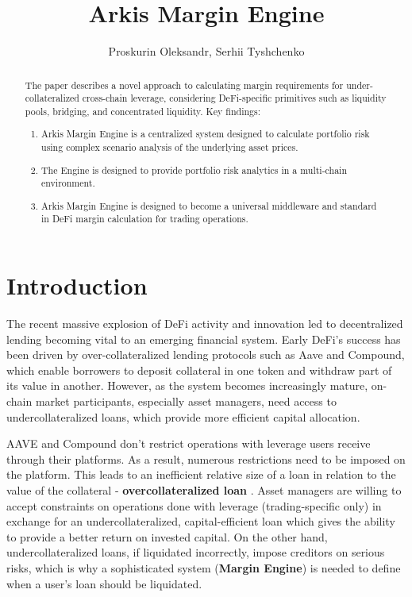 \documentclass[conference]{IEEEtran}
\begin{document}
 
\title{Arkis Margin Engine}
\author{Proskurin Oleksandr, Serhii Tyshchenko}

\maketitle
    \begin{abstract}
The paper describes a novel approach to calculating margin requirements for under-collateralized cross-chain leverage, considering DeFi-specific primitives such as liquidity pools, bridging, and concentrated liquidity. 
Key findings: 
\begin{enumerate}
  \item Arkis Margin Engine is a centralized system designed to calculate portfolio risk using complex scenario analysis of the underlying asset prices.
  \item The Engine is designed to provide portfolio risk analytics in a multi-chain environment. 
  \item Arkis Margin Engine is designed to become a universal middleware and standard in DeFi margin calculation for trading operations.
  \end{enumerate}
\end{abstract}





\section{Introduction}
The recent massive explosion of DeFi activity and innovation led to decentralized lending becoming vital to an emerging financial system. Early DeFi's success has been driven by over-collateralized lending protocols such as Aave and Compound, which enable borrowers to deposit collateral in one token and withdraw part of its value in another. However, as the system becomes increasingly mature, on-chain market participants, especially asset managers, need access to undercollateralized loans, which provide more efficient capital allocation.

AAVE and Compound don't restrict operations with leverage users receive through their platforms. As a result, numerous restrictions need to be imposed on the platform. This leads to an inefficient relative size of a loan in relation to the value of the collateral - \textbf {overcollateralized loan} \cite{aave-whitepaper} \cite{compound-whitepaper}. Asset managers are willing to accept constraints on operations done with leverage (trading-specific only) in exchange for an undercollateralized, capital-efficient loan which gives the ability to provide a better return on invested capital. On the other hand, undercollateralized loans, if liquidated incorrectly, impose creditors on serious risks, which is why a sophisticated system (\textbf {Margin Engine}) is needed to define when a user's loan should be liquidated. 
\end{document}
